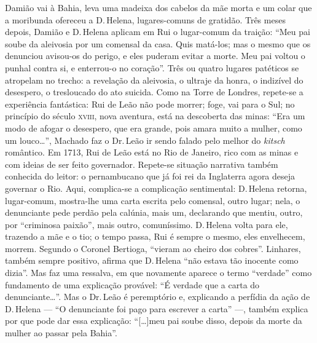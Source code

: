 Damião vai à Bahia, leva uma madeixa dos cabelos da mãe morta e um colar
que a moribunda ofereceu a D.\,Helena, lugares-comuns de gratidão. Três
meses depois, Damião e D.\,Helena aplicam em Rui o lugar-comum da
traição: ``Meu pai soube da aleivosia por um comensal da casa. Quis
matá-los; mas o mesmo que os denunciou avisou-os do perigo, e eles
puderam evitar a morte. Meu pai voltou o punhal contra si, e enterrou-o
no coração''. Três ou quatro lugares patéticos se atropelam no trecho: a
revelação da aleivosia, o ultraje da honra, o indizível do desespero, o
tresloucado do ato suicida. Como na Torre de Londres, repete-se a
experiência fantástica: Rui de Leão não pode morrer; foge, vai para o
Sul; no princípio do século \textsc{xviii}, nova aventura, está na descoberta das
minas: ``Era um modo de afogar o desespero, que era grande, pois amara
muito a mulher, como um louco\ldots{}'', Machado faz o Dr.\,Leão ir sendo
falado pelo melhor do \emph{kitsch} romântico. Em 1713, Rui de Leão está
no Rio de Janeiro, rico com as minas e com ideias de ser feito
governador. Repete-se situação narrativa também conhecida do leitor: o
pernambucano que já foi rei da Inglaterra agora deseja governar o Rio.
Aqui, complica-se a complicação sentimental: D.\,Helena retorna,
lugar-comum, mostra-lhe uma carta escrita pelo comensal, outro lugar;
nela, o denunciante pede perdão pela calúnia, mais um, declarando que
mentiu, outro, por ``criminosa paixão'', mais outro, comuníssimo. D.\,Helena volta para ele, trazendo a mãe e o tio; o tempo passa, Rui é
sempre o mesmo, eles envelhecem, morrem. Segundo o Coronel Bertioga,
``vieram ao cheiro dos cobres''. Linhares, também sempre positivo, afirma
que D.\,Helena ``não estava tão inocente como dizia''. Mas faz uma
ressalva, em que novamente aparece o termo ``verdade'' como fundamento de
uma explicação provável: ``É verdade que a carta do denunciante\ldots{}''. Mas
o Dr.\,Leão é peremptório e, explicando a perfídia da ação de D.\,Helena
--- ``O denunciante foi pago para escrever a carta'' ---, também explica por
que pode dar essa explicação: ``{[}\ldots{}{]}meu pai soube disso, depois
da morte da mulher ao passar pela Bahia''.

